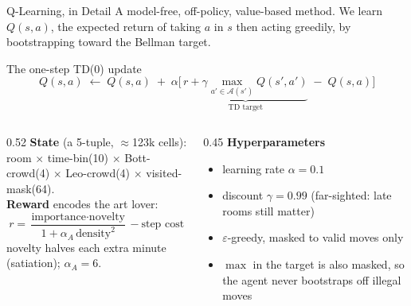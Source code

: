 \documentclass[aspectratio=169, 11pt]{beamer}
\newcommand{\thead}[1]{\textbf{#1}}
\begin{document}
\begin{frame}{Q-Learning, in Detail}
\footnotesize
A model-free, off-policy, value-based method. We learn $Q(s,a)$, the expected return
of taking $a$ in $s$ then acting greedily, by bootstrapping toward the Bellman target.
\vspace{0.2em}
\begin{block}{The one-step TD(0) update}
\[
Q(s,a)\;\leftarrow\;Q(s,a)\;+\;\alpha\Big[\,\underbrace{r+\gamma\max_{a'\in\mathcal{A}(s')}Q(s',a')}_{\text{TD target}}\;-\;Q(s,a)\Big]
\]
\end{block}
\vspace{-0.2em}
\begin{columns}[T]
\begin{column}{0.52\textwidth}
\thead{State} (a 5-tuple, $\approx$123k cells):\\
room $\times$ time-bin(10) $\times$ Bott-crowd(4) $\times$ Leo-crowd(4) $\times$ visited-mask(64).\\[0.3em]
\thead{Reward} encodes the art lover:
\[
r=\frac{\text{importance}\cdot\text{novelty}}{1+\alpha_{\!A}\,\text{density}^2}-\text{step cost}
\]
novelty halves each extra minute (satiation); $\alpha_A{=}6$.
\end{column}
\begin{column}{0.45\textwidth}
\thead{Hyperparameters}
\begin{itemize}\setlength\itemsep{1pt}
\item learning rate $\alpha=0.1$
\item discount $\gamma=0.99$ (far-sighted: late rooms still matter)
\item $\varepsilon$-greedy, masked to valid moves only
\item $\max$ in the target is also masked, so the agent never bootstraps off illegal moves
\end{itemize}
\end{column}
\end{columns}
\end{frame}
\end{document}
